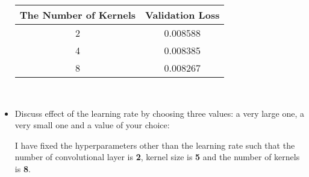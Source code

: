\documentclass[12pt]{article}
\begin{document}
\begin{itemize}
\begin{minipage}{\textwidth}
\begin{minipage}{0.49\textwidth}
				\centering
				\begin{tabular}{ | c | c | }
				  \hline			
				  \bf The Number of Kernels & \bf Validation Loss \\
				  \hline		
				  2 & 0.008588 \\
				  \hline	
				  4 & 0.008385 \\
				  \hline	
				  8 & 0.008267 \\
				  \hline
				\end{tabular}
				\captionsetup{width=.8\textwidth}
			\end{minipage}
		\end{minipage} \\
        
        \item Discuss effect of the learning rate by choosing three values: a very large one, a very small one and a value of your choice:
        
        I have fixed the hyperparameters other than the learning rate such that the number of convolutional layer is \textbf{2}, kernel size is \textbf{5} and the number of kernels is \textbf{8}.


\end{itemize}
\end{document}
